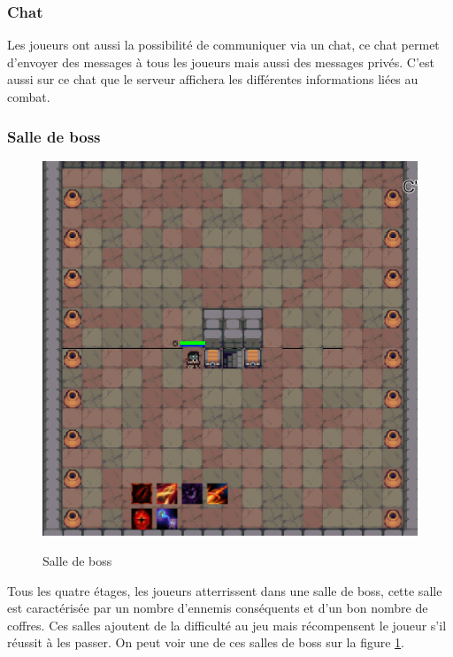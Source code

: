 \documentclass[a4paper, 12pt, twoside]{article}
\begin{document}
\subsubsection{Chat}
Les joueurs ont aussi la possibilité de communiquer via un chat, ce chat permet d'envoyer des messages à tous les joueurs mais aussi des messages privés. C'est aussi sur ce chat que le serveur affichera les différentes informations liées au combat.

\subsubsection{Salle de boss}
\begin{figure}[H]
    \begin{center}
    \includegraphics[scale=0.2]{./Salle_Boss} \\
    \caption{Salle de boss}
    \label{boss}
    \end{center}
\end{figure}
Tous les quatre étages, les joueurs atterrissent dans une salle de boss, cette salle est caractérisée par un nombre d'ennemis conséquents et d'un bon nombre de coffres. Ces salles ajoutent de la difficulté au jeu mais récompensent le joueur s'il réussit à les passer. On peut voir une de ces salles de boss sur la figure \ref{boss}.
\end{document}
